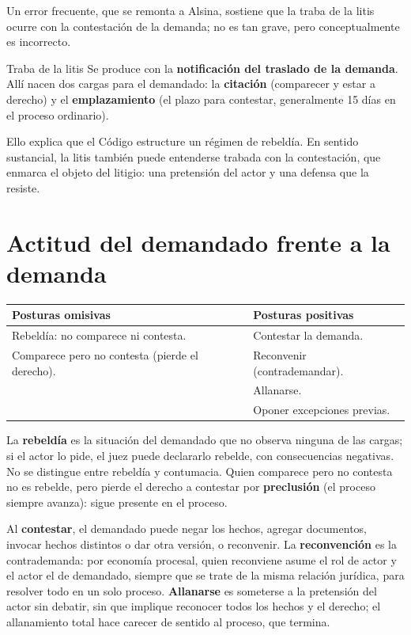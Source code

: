 \documentclass[12pt,oneside]{book}
\renewcommand{\arraystretch}{1.15}
\begin{document}
Un error frecuente, que se remonta a Alsina, sostiene que la traba de la litis ocurre con la contestación de la demanda; no es tan grave, pero conceptualmente es incorrecto.

\begin{definition}{Traba de la litis}
Se produce con la \textbf{notificación del traslado de la demanda}. Allí nacen dos cargas para el demandado: la \textbf{citación} (comparecer y estar a derecho) y el \textbf{emplazamiento} (el plazo para contestar, generalmente 15 días en el proceso ordinario).
\end{definition}

Ello explica que el Código estructure un régimen de rebeldía. En sentido sustancial, la litis también puede entenderse trabada con la contestación, que enmarca el objeto del litigio: una pretensión del actor y una defensa que la resiste.

\section{Actitud del demandado frente a la demanda}

\begin{table}[H]
\centering
\renewcommand{\arraystretch}{1.25}
\begin{tabularx}{\textwidth}{>{\RaggedRight\arraybackslash}X>{\RaggedRight\arraybackslash}X}
\toprule
\textbf{Posturas omisivas} & \textbf{Posturas positivas} \\
\midrule
Rebeldía: no comparece ni contesta. & Contestar la demanda. \\
Comparece pero no contesta (pierde el derecho). & Reconvenir (contrademandar). \\
 & Allanarse. \\
 & Oponer excepciones previas. \\
\bottomrule
\end{tabularx}
\end{table}

La \textbf{rebeldía} es la situación del demandado que no observa ninguna de las cargas; si el actor lo pide, el juez puede declararlo rebelde, con consecuencias negativas. No se distingue entre rebeldía y contumacia. Quien comparece pero no contesta no es rebelde, pero pierde el derecho a contestar por \textbf{preclusión} (el proceso siempre avanza): sigue presente en el proceso.

Al \textbf{contestar}, el demandado puede negar los hechos, agregar documentos, invocar hechos distintos o dar otra versión, o reconvenir. La \textbf{reconvención} es la contrademanda: por economía procesal, quien reconviene asume el rol de actor y el actor el de demandado, siempre que se trate de la misma relación jurídica, para resolver todo en un solo proceso. \textbf{Allanarse} es someterse a la pretensión del actor sin debatir, sin que implique reconocer todos los hechos y el derecho; el allanamiento total hace carecer de sentido al proceso, que termina.
\end{document}
